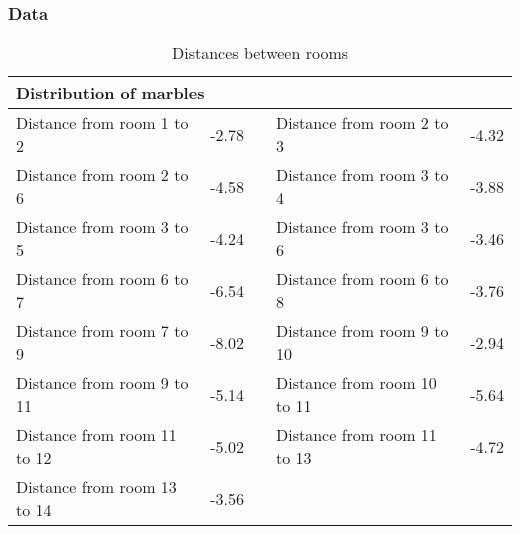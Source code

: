 \documentclass[../Head/Main.tex]{subfiles}
\begin{document}
\subsubsection{Data}
\begin{table}[H]
	\centering
	\begin{tabular}{l r c l r}
		\hline
		\multicolumn{5}{l}{\textbf{Distribution of marbles}}  			\\ \hline
		Distance from room 1 to 2   & -2.78 & &
		Distance from room 2 to 3   & -4.32\\
		Distance from room 2 to 6   & -4.58 & &
		Distance from room 3 to 4   & -3.88\\
		Distance from room 3 to 5   & -4.24 & &
		Distance from room 3 to 6   & -3.46\\
		Distance from room 6 to 7   & -6.54 & &
		Distance from room 6 to 8   & -3.76\\
		Distance from room 7 to 9   & -8.02 & &
		Distance from room 9 to 10  & -2.94\\
		Distance from room 9 to 11  & -5.14 & &
		Distance from room 10 to 11 & -5.64\\
		Distance from room 11 to 12 & -5.02 & &
		Distance from room 11 to 13 & -4.72\\
		Distance from room 13 to 14 & -3.56 & & \\						\hline
	\end{tabular}
	\caption{Distances between rooms}
	\label{tab:dist_geogebra}
\end{table}
\end{document}
